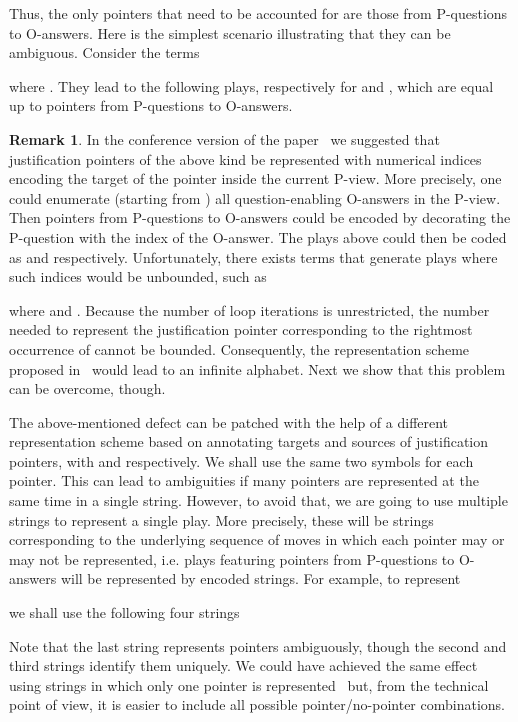 \documentclass{CSML}
\theoremstyle{definition}\newtheorem{definition}[thm]{Definition}
\theoremstyle{definition}\newtheorem{example}[thm]{Example}
\theoremstyle{definition}\newtheorem{proposition}[thm]{Proposition}
\theoremstyle{definition}\newtheorem{lemma}[thm]{Lemma}
\theoremstyle{definition}\newtheorem{theorem}[thm]{Theorem}
\theoremstyle{definition}\newtheorem{corollary}[thm]{Corollary}
\theoremstyle{definition}\newtheorem{remark}[thm]{Remark}
\begin{document}
\noindent Thus, the only pointers that need to be accounted for are those from P-questions
to O-answers. Here is the simplest scenario illustrating that they can be ambiguous.
Consider the terms 

where .
They lead to the following plays, respectively for  and , which are equal up to 
pointers from P-questions to O-answers.

\medskip


\begin{remark}{
In the conference version of the paper~\cite{MT10} we suggested that justification pointers of the above kind be represented
with numerical indices encoding the target of the pointer inside the current P-view.
More precisely, one could enumerate (starting from ) all question-enabling O-answers in the P-view. Then pointers from P-questions
to O-answers could be encoded by decorating the P-question with the index of the O-answer. The plays above 
could then be coded as  and  respectively.
Unfortunately, there exists terms that  generate plays where such indices would be unbounded, such as

where  and . Because the number of loop iterations is unrestricted, the number needed to represent the
justification pointer corresponding to the rightmost occurrence of  cannot be bounded. Consequently, the representation scheme proposed in~\cite{MT10}
would lead to an infinite alphabet. Next we show that this problem can be overcome, though.
}
\end{remark}
The above-mentioned defect can be patched with the help of a different representation scheme based on annotating targets and sources of 
justification pointers, with  and  respectively. We shall use the same two symbols for each pointer.
This can lead to ambiguities if many pointers are represented at the same time in a single string.  However, to avoid that, we are going to use
multiple strings to represent a single play. More precisely, these will be strings corresponding to the underlying sequence of moves
in which each pointer may or may not be represented, i.e. 
plays featuring  pointers from P-questions to O-answers will be represented by  encoded strings. For example, to represent

\medskip


we shall use the following four strings

Note that the last string represents pointers ambiguously, though the second and third strings identify them uniquely. 
We could have achieved the same effect using strings  in which only one pointer is represented~\cite{HMO11} but, from the technical point of view, it is easier to include 
all possible pointer/no-pointer combinations.
\end{document}
